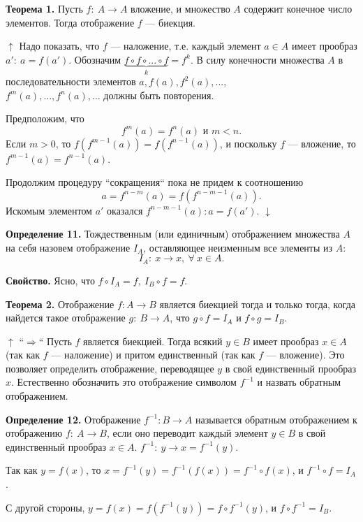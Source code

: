 \documentclass{article}
\begin{document}
    \textbf{Теорема 1.} Пусть $f:\ A \rightarrow A$ вложение, и множество $A$ содержит конечное число элементов. Тогда отображение $f$ --- биекция.
    
    $\uparrow$ Надо показать, что $f$ --- наложение, т.е. каждый элемент $a \in A$ имеет прообраз $a':\ a = f(a')$. Обозначим $\underbrace{f \circ f \circ ... \circ f}_{k} = f^k$. В силу конечности множества $A$ в последовательности элементов $a, f(a), f^2(a), ...,$\\ $f^m(a), ..., f^n(a), ...$ должны быть повторения.
    
    Предположим, что
    \[f^m(a) = f^n(a) \text{ и } m < n.\]
    Если $m > 0$, то $f(f^{m - 1}(a)) = f(f^{n - 1}(a))$, и поскольку $f$ --- вложение, то $f^{m - 1}(a) = f^{n - 1}(a)$.

    Продолжим процедуру ``сокращения`` пока не придем к соотношению
    \[a = f^{n - m}(a) = f(f^{n - m - 1}(a)).\]
    Искомым элементом $a'$ оказался $f^{n - m - 1}(a): a = f(a')$. $\downarrow$

    \textbf{Определение 11.} Тождественным (или единичным) отображением множества $A$ на себя назовем отображение $I_A$, оставляющее неизменным все элементы из $A$:
    \[I_A:\ x \rightarrow x,\ \forall\ x \in A.\]

    \textbf{Свойство.} Ясно, что $f \circ I_A = f,\ I_B \circ f = f$.

    \textbf{Теорема 2.} Отображение $f: A \rightarrow B$ является биекцией тогда и только тогда, когда найдется такое отображение $g:\ B \rightarrow A$, что $g \circ f = I_A$ и $f \circ g = I_B$.
    
    $\uparrow$ ``$\Rightarrow$`` Пусть $f$ является биекцией. Тогда всякий $y \in B$ имеет прообраз $x \in A$ (так как $f$ --- наложение) и притом единственный (так как $f$ --- вложение). Это позволяет определить отображение, переводящее $y$ в свой единственный прообраз $x$. Естественно обозначить это отображение символом $f^{-1}$ и назвать обратным отображением.
    
    \textbf{Определение 12.} Отображение $f^{-1}: B \rightarrow A$ называется обратным отображением к отображению $f:\ A \rightarrow B$, если оно переводит каждый элемент $y \in B$ в свой единственный прообраз $x \in A$. $f^{-1}:\ y \rightarrow x = f^{-1}(y)$.
    
    Так как $y = f(x)$, то $x = f^{-1}(y) = f^{-1}(f(x)) = f^{-1} \circ f(x)$, и $f^{-1} \circ f = I_A$.
    
    С другой стороны, $y = f(x) = f(f^{-1}(y)) = f \circ f^{-1}(y)$, и $f \circ f^{-1} = I_B$.
    
\end{document}
